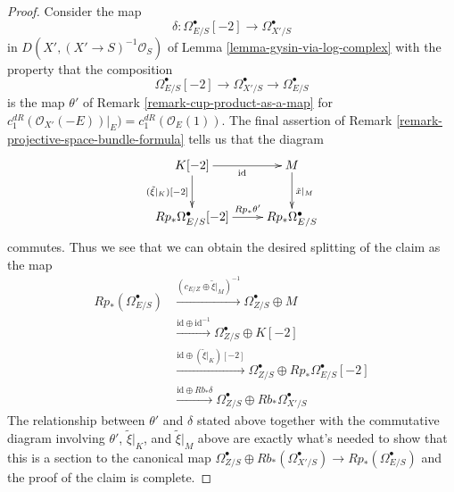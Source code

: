 \documentclass[10pt,a4paper]{amsart}
\theoremstyle{plain}
\theoremstyle{definition}
\theoremstyle{remark}
\numberwithin{equation}{subsection}
\begin{document}
\begin{proof}
\medskip\noindent
Consider the map
$$
\delta : \Omega^\bullet_{E/S}[-2] \longrightarrow \Omega^\bullet_{X'/S}
$$
in $D(X', (X' \to S)^{-1}\mathcal{O}_S)$ of
Lemma \ref{lemma-gysin-via-log-complex}
with the property that the composition
$$
\Omega^\bullet_{E/S}[-2] \longrightarrow \Omega^\bullet_{X'/S}
\longrightarrow
\Omega^\bullet_{E/S}
$$
is the map $\theta'$ of Remark \ref{remark-cup-product-as-a-map} for
$c_1^{dR}(\mathcal{O}_{X'}(-E))|_E) = c_1^{dR}(\mathcal{O}_E(1))$.
The final assertion of Remark \ref{remark-projective-space-bundle-formula}
tells us that the diagram
$$
\xymatrix{
K[-2] \ar[d]_{(\tilde \xi|_K)[-2]} \ar[r]_{\text{id}} &
M \ar[d]^{\tilde x|_M} \\
Rp_*\Omega^\bullet_{E/S}[-2] \ar[r]^-{Rp_*\theta'} &
Rp_*\Omega^\bullet_{E/S}
}
$$
commutes. Thus we see that we can obtain the desired splitting of
the claim as the map
\begin{align*}
Rp_*(\Omega^\bullet_{E/S})
& \xrightarrow{(c_{E/Z} \oplus \tilde \xi|_M)^{-1}}
\Omega^\bullet_{Z/S} \oplus M \\
& \xrightarrow{\text{id} \oplus \text{id}^{-1}}
\Omega^\bullet_{Z/S} \oplus K[-2] \\
& \xrightarrow{\text{id} \oplus (\tilde \xi|_K)[-2]}
\Omega^\bullet_{Z/S} \oplus Rp_*\Omega^\bullet_{E/S}[-2] \\
& \xrightarrow{\text{id} \oplus Rb_*\delta}
\Omega^\bullet_{Z/S} \oplus Rb_*\Omega^\bullet_{X'/S}
\end{align*}
The relationship between $\theta'$ and $\delta$ stated above
together with the commutative diagram involving $\theta'$, $\tilde \xi|_K$,
and $\tilde \xi|_M$ above are exactly what's needed to
show that this is a section to the canonical map
$\Omega^\bullet_{Z/S} \oplus Rb_*(\Omega^\bullet_{X'/S}) \to
Rp_*(\Omega^\bullet_{E/S})$ and the proof of the claim is complete.
\end{proof}
\end{document}

